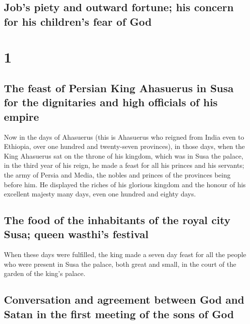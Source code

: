 \hypertarget{jobs-piety-and-outward-fortune-his-concern-for-his-childrens-fear-of-god}{%
\subsection{Job's piety and outward fortune; his concern for his
children's fear of
God}\label{jobs-piety-and-outward-fortune-his-concern-for-his-childrens-fear-of-god}}

\hypertarget{section}{%
\section{1}\label{section}}

\hypertarget{the-feast-of-persian-king-ahasuerus-in-susa-for-the-dignitaries-and-high-officials-of-his-empire}{%
\subsection{The feast of Persian King Ahasuerus in Susa for the
dignitaries and high officials of his
empire}\label{the-feast-of-persian-king-ahasuerus-in-susa-for-the-dignitaries-and-high-officials-of-his-empire}}

 Now in the days of Ahasuerus (this is Ahasuerus who
reigned from India even to Ethiopia, over one hundred and twenty-seven
provinces),  in those days, when the King Ahasuerus sat on
the throne of his kingdom, which was in Susa the palace, 
in the third year of his reign, he made a feast for all his princes and
his servants; the army of Persia and Media, the nobles and princes of
the provinces being before him.  He displayed the riches
of his glorious kingdom and the honour of his excellent majesty many
days, even one hundred and eighty days.

\hypertarget{the-food-of-the-inhabitants-of-the-royal-city-susa-queen-wasthis-festival}{%
\subsection{The food of the inhabitants of the royal city Susa; queen
wasthi's
festival}\label{the-food-of-the-inhabitants-of-the-royal-city-susa-queen-wasthis-festival}}

 When these days were fulfilled, the king made a seven day
feast for all the people who were present in Susa the palace, both great
and small, in the court of the garden of the king's palace.

\hypertarget{conversation-and-agreement-between-god-and-satan-in-the-first-meeting-of-the-sons-of-god}{%
\subsection{Conversation and agreement between God and Satan in the
first meeting of the sons of
God}\label{conversation-and-agreement-between-god-and-satan-in-the-first-meeting-of-the-sons-of-god}}

